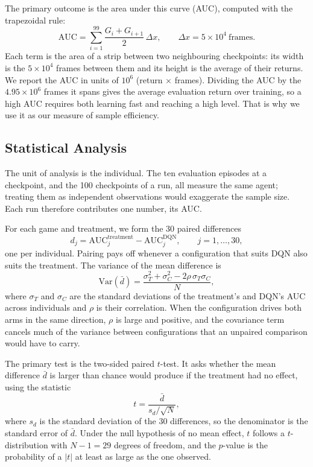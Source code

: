 \documentclass[conference,a4paper]{IEEEtran}
\begin{document}
The primary outcome is the area under this curve (AUC), computed with the trapezoidal rule:
\begin{equation}
\mathrm{AUC}=\sum_{i=1}^{99}\frac{G_i+G_{i+1}}{2}\,\Delta x,\qquad \Delta x=5\times10^{4}\ \text{frames}.
\end{equation}
Each term is the area of a strip between two neighbouring checkpoints: its width is the $5\times10^4$ frames between them
and its height is the average of their returns. We report the AUC in units of $10^{6}$ (return $\times$ frames).
Dividing the AUC by the $4.95\times10^{6}$ frames it spans gives the average evaluation return over training, so a high
AUC requires both learning fast and reaching a high level. That is why we use it as our measure of sample efficiency.

\subsection{Statistical Analysis}\label{sec:stats}
The unit of analysis is the individual. The ten evaluation episodes at a checkpoint, and the 100 checkpoints of a run,
all measure the same agent; treating them as independent observations would exaggerate the sample size. Each run
therefore contributes one number, its AUC.

For each game and treatment, we form the 30 paired differences
\begin{equation}
d_j=\mathrm{AUC}_j^{\mathrm{treatment}}-\mathrm{AUC}_j^{\mathrm{DQN}},\qquad j=1,\dots,30,
\end{equation}
one per individual. Pairing pays off whenever a configuration that suits DQN also suits the treatment. The variance of
the mean difference is
\begin{equation}
\mathrm{Var}(\bar d)=\frac{\sigma_T^2+\sigma_C^2-2\rho\,\sigma_T\sigma_C}{N},
\end{equation}
where $\sigma_T$ and $\sigma_C$ are the standard deviations of the treatment's and DQN's AUC across individuals and $\rho$
is their correlation. When the configuration drives both arms in the same direction, $\rho$ is large and positive, and
the covariance term cancels much of the variance between configurations that an unpaired comparison would have to
carry.

The primary test is the two-sided paired $t$-test. It asks whether the mean difference $\bar d$ is larger than chance
would produce if the treatment had no effect, using the statistic
\begin{equation}
t=\frac{\bar d}{s_d/\sqrt{N}},
\end{equation}
where $s_d$ is the standard deviation of the 30 differences, so the denominator is the standard error of $\bar d$.
Under the null hypothesis of no mean effect, $t$ follows a $t$-distribution with $N-1=29$ degrees of freedom, and the
$p$-value is the probability of a $|t|$ at least as large as the one observed.
\end{document}
